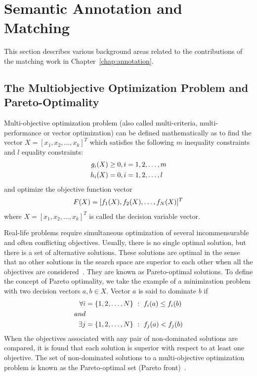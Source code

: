 \section{Semantic Annotation and Matching}
This section describes various background areas related to the contributions of the matching work in Chapter~\ref{chap:annotation}.
\label{sec:annotAndMatching}
\subsection{The Multiobjective Optimization Problem and Pareto-Optimality}
Multi-objective optimization problem (also called multi-criteria, multi-performance or vector optimization) can be defined mathematically as to find the vector $X=[x_1, x_2, \ldots, x_k]^T$ which satisfies the following $m$ inequality constraints and $l$ equality constraints:
\begin{align}
\notag g_i(X)&\geq0, i=1,2,\ldots,m\\
\notag h_i(X)&=0, i=1,2,\ldots,l
\end{align}
and optimize the objective function vector
\begin{align}
\notag F(X)=[f_1(X), f_2(X), \ldots, f_N(X)]^T
\end{align}
where $X=[x_1, x_2, \ldots, x_k]^T$ is called the decision variable vector.

Real-life problems require simultaneous optimization of several incommensurable and often conflicting objectives. Usually, there is no single optimal solution, but there is a set of alternative solutions. These solutions are optimal in the sense that no other solutions in the search space are superior to each other when all the objectives are considered~\cite{SumanSurvey}. They are known as Pareto-optimal solutions. To define the concept of Pareto optimality, we take the example of a minimization problem with two decision vectors $a, b\in X$. Vector $a$ is said to dominate $b$ if
\begin{align}
\notag \forall i &= \{1,2,\ldots,N\}~:~f_i(a)\leq f_i(b)\\
\notag and\\
\notag \exists j &= \{1,2,\ldots,N\}~:~f_j(a)<f_j(b)
\end{align}
When the objectives associated with any pair of non-dominated solutions are compared, it is found that each solution is superior with respect to at least one objective. The set of non-dominated solutions to a multi-objective optimization problem is known as the Pareto-optimal set (Pareto front)~\cite{Zitzler98multiobjectiveoptimization}.

